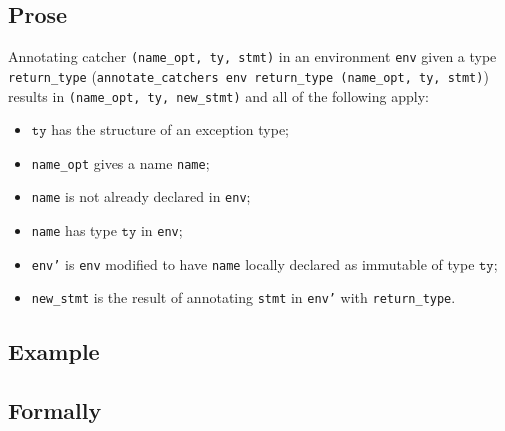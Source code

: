 \documentclass{book}
\newcommand\todocomment[1]{}
\newcommand\name[0]{\texttt{name}}
\newcommand\annotateblock[1]{\texttt{annotate\_block}(#1)}
\newcommand\annotatecatcher[1]{\texttt{annotate\_catcher}(#1)}
\newcommand\checkvarnotinenv[1]{\texttt{check\_var\_not\_in\_env}(#1)}
\newcommand\tty[0]{\texttt{ty}}
\begin{document}
\begin{itemize}
  \subsection{Prose}
   Annotating catcher \texttt{(name\_opt, ty, stmt)} in an environment
\texttt{env} given a type \texttt{return\_type} (\texttt{annotate\_catchers env return\_type (name\_opt, ty, stmt)})
results in \texttt{(name\_opt, ty, new\_stmt)} and all of the following apply:
   \begin{itemize}
   \item $\tty$ has the structure of an exception type;
   \item \texttt{name\_opt} gives a name \texttt{name};
   \item \texttt{name} is not already declared in \texttt{env};
   \item \texttt{name} has type $\tty$ in \texttt{env}; \todocomment{ROMAN: doesn't appear in the code}
   \item \texttt{env'} is \texttt{env} modified to have \texttt{name} locally declared as immutable of type $\tty$;
   \item \texttt{new\_stmt} is the result of annotating \texttt{stmt} in \texttt{env'} with \texttt{return\_type}.
   \end{itemize}

  \subsection{Example}



\begin{emptyformal}
    \subsection{Formally}
\end{emptyformal}


\end{itemize}
\end{document}
